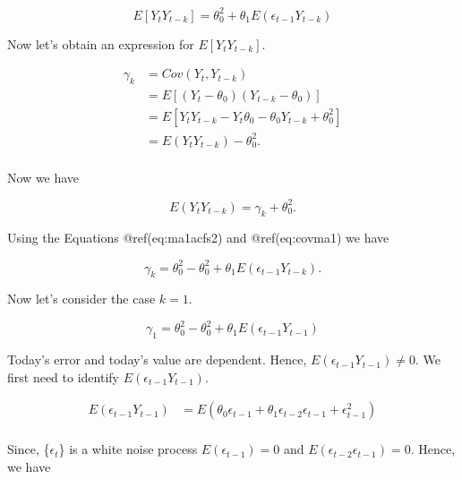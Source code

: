 \documentclass[
  11pt,
  a4paper,
]{report}
\begin{document}
\begin{equation}
E[Y_tY_{t-k}] = \theta_0^2  + \theta_1 E(\epsilon_{t-1}Y_{t-k}) 
\end{equation}

Now let's obtain an expression for \(E[Y_t Y_{t-k}]\).

\begin{equation}
\begin{aligned}
  \gamma_k &= Cov(Y_t, Y_{t-k}) \\
         &= E[(Y_t-\theta_0)(Y_{t-k}-\theta_0)] \\
         &= E[Y_tY_{t-k}-Y_t\theta_0-\theta_0 Y_{t-k} +\theta_0^2] \\
         &= E(Y_t Y_{t-k}) - \theta_0^2. \\
\end{aligned}
\end{equation}

Now we have

\begin{equation}
  E(Y_t Y_{t-k}) = \gamma_k + \theta_0^2.
\end{equation}

Using the Equations @ref(eq:ma1acfs2) and @ref(eq:covma1) we have

\begin{equation}
  \gamma_k = \theta_0^2 - \theta_0^2 + \theta_1E(\epsilon_{t-1}Y_{t-k}).
\end{equation}

Now let's consider the case \(k=1\).

\begin{equation}
  \gamma_1 = \theta_0^2 - \theta_0^2 + \theta_1E(\epsilon_{t-1}Y_{t-1})
\end{equation}

Today's error and today's value are dependent. Hence,
\(E(\epsilon_{t-1}Y_{t-1}) \neq 0.\) We first need to identify
\(E(\epsilon_{t-1}Y_{t-1})\).

\begin{equation}
\begin{aligned}
E(\epsilon_{t-1}Y_{t-1}) &= E(\theta_0 \epsilon_{t-1} + \theta_1 \epsilon_{t-2} \epsilon_{t-1}+ \epsilon_{t-1}^2)\\
\end{aligned}
\end{equation}

Since, \{\(\epsilon_t\)\} is a white noise process
\(E(\epsilon_{t-1}) = 0\) and \(E(\epsilon_{t-2} \epsilon_{t-1}) = 0\).
Hence, we have
\end{document}
